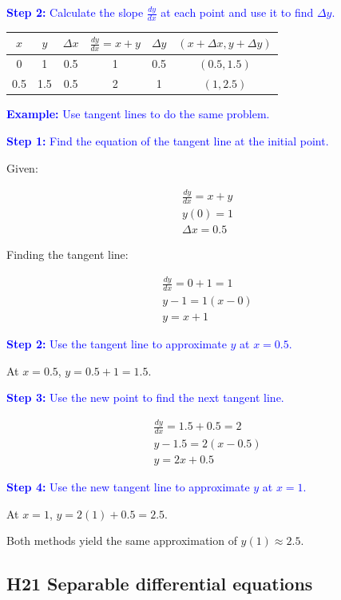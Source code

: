 \documentclass[letterpaper, 12pt]{article}
\newcommand{\example}[1]{\textcolor{blue}{\textbf{Example:} #1}}
\newcommand{\step}[2]{\textcolor{blue}{\textbf{Step #1:} #2}}
\begin{document}
\step{2}{Calculate the slope $\displaystyle \frac{dy}{dx}$ at each point and use it to find $\Delta y$.}

\begin{table}[H]
\centering
\begin{tabular}{|c|c|c|c|c|c|}
\hline
$x$ & $y$ & $\Delta x$ & $\frac{dy}{dx} = x + y$ & $\Delta y$ & $(x + \Delta x, y + \Delta y)$ \\
\hline
0 & 1 & 0.5 & 1 & 0.5 & $(0.5, 1.5)$ \\
0.5 & 1.5 & 0.5 & 2 & 1 & $(1, 2.5)$ \\
\hline
\end{tabular}
\end{table}

\example{Use tangent lines to do the same problem.}

\step{1}{Find the equation of the tangent line at the initial point.}

Given:

\begin{gather*}
\frac{dy}{dx} = x + y \\
y(0) = 1 \\
\Delta x = 0.5
\end{gather*}

Finding the tangent line:

\begin{gather*}
\frac{dy}{dx} = 0 + 1 = 1 \\
y - 1 = 1(x - 0) \\
y = x + 1
\end{gather*}

\step{2}{Use the tangent line to approximate $y$ at $x=0.5$.}

At $x=0.5$, $y = 0.5 + 1 = 1.5$.

\step{3}{Use the new point to find the next tangent line.}

\begin{gather*}
\frac{dy}{dx} = 1.5 + 0.5 = 2 \\
y - 1.5 = 2(x-0.5) \\
y = 2x + 0.5
\end{gather*}

\step{4}{Use the new tangent line to approximate $y$ at $x=1$.}

At $x=1$, $y = 2(1) + 0.5 = \boxed{2.5}$.

Both methods yield the same approximation of $y(1) \approx 2.5$.

\subsection*{H21 Separable differential equations}
\end{document}

